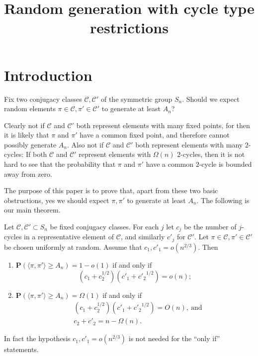 \documentclass[ALCO,ThmDefs,Unicode,epreuves]{cedram}
\author{\firstname{Sean} \lastname{Eberhard}}
\author{\firstname{Daniele} \lastname{Garzoni}}
\title[Random generation with cycle type restrictions]{Random generation with cycle type restrictions}
\newcommand\calC{\mathcal{C}}
\renewcommand\P{\mathbf{P}}
\begin{document}
\maketitle

\section{Introduction}

Fix two conjugacy classes $\calC, \calC'$ of the symmetric group $S_n$. Should we expect random elements $\pi\in\calC, \pi'\in\calC'$ to generate at least $A_n$?

Clearly not if $\calC$ and $\calC'$ both represent elements with many fixed points, for then it is likely that $\pi$ and $\pi'$ have a common fixed point, and therefore cannot possibly generate $A_n$. Also not if $\calC$ and $\calC'$ both represent elements with many $2$-cycles: If both $\calC$ and $\calC'$ represent elements with $\Omega(n)$ $2$-cycles, then it is not hard to see that the probability that $\pi$ and $\pi'$ have a common $2$-cycle is bounded away from zero.

The purpose of this paper is to prove that, apart from these two basic obstructions, yes we should expect $\pi, \pi'$ to generate at least $A_n$. The following is our main theorem.
\begin{theorem}\label{main-thm}
Let $\calC, \calC' \subset S_n$ be fixed conjugacy classes. For each $j$ let $c_j$ be the number of $j$-cycles in a representative element of $\calC$, and similarly $c'_j$ for $\calC'$. Let $\pi\in\calC, \pi'\in\calC'$ be chosen uniformly at random. Assume that $c_1, c'_1 = o(n^{2/3})$. Then

\begin{enumerate}
 \item\label{theo1.1_1} $\P(\langle \pi, \pi' \rangle \geq A_n) = 1 - o(1)$ if and only if
 \[
 (c_1 + c_2^{1/2}) ({c'_1} + {c'_2}^{1/2}) = o(n) ;
 \]
 \item\label{theo1.1_2} $\P(\langle \pi, \pi' \rangle \geq A_n) = \Omega(1)$ if and only if
 \begin{align*}
 &(c_1 + c_2^{1/2}) ({c'_1} + {c'_2}^{1/2}) = O(n), ~\text{and}\\
 &c_2 + c'_2 = n - \Omega(n).
 \end{align*}
\end{enumerate}
In fact the hypothesis $c_1, c'_1 = o(n^{2/3})$ is not needed for the ``only if'' statements.
\end{theorem}
\end{document}
